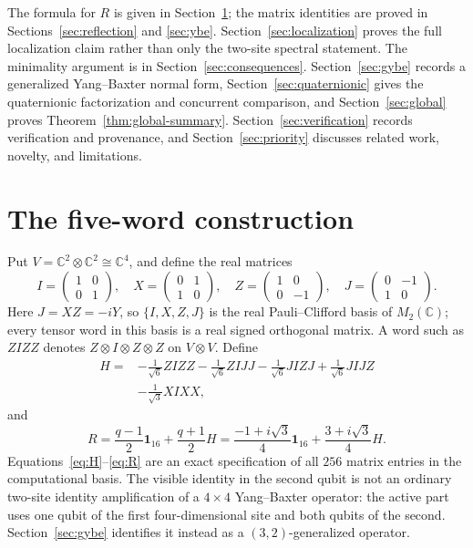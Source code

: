 \documentclass[11pt]{article}
\theoremstyle{remark}
\newcommand{\Id}{\mathbf 1}
\newcommand{\bbC}{\mathbb C}
\begin{document}
The formula for \(R\) is given in Section~\ref{sec:construction}; the matrix
identities are proved in Sections~\ref{sec:reflection} and
\ref{sec:ybe}.  Section~\ref{sec:localization} proves the full localization
claim rather than only the two-site spectral statement.  The minimality
argument is in Section~\ref{sec:consequences}.  Section~\ref{sec:gybe}
records a generalized Yang--Baxter normal form, Section~\ref{sec:quaternionic}
gives the quaternionic factorization and concurrent comparison, and
Section~\ref{sec:global} proves Theorem~\ref{thm:global-summary}.
Section~\ref{sec:verification} records verification and provenance, and
Section~\ref{sec:priority} discusses related work, novelty, and limitations.

\section{The five-word construction}\label{sec:construction}

Put \(V=\bbC^2\otimes\bbC^2\cong\bbC^4\), and define the real matrices
\[
  I=\begin{pmatrix}1&0\\0&1\end{pmatrix},\quad
  X=\begin{pmatrix}0&1\\1&0\end{pmatrix},\quad
  Z=\begin{pmatrix}1&0\\0&-1\end{pmatrix},\quad
  J=\begin{pmatrix}0&-1\\1&0\end{pmatrix}.
\]
Here \(J=XZ=-iY\), so \(\{I,X,Z,J\}\) is the real Pauli--Clifford basis of
\(M_2(\bbC)\); every tensor word in this basis is a real signed orthogonal
matrix.
A word such as \(ZIZZ\) denotes
\(Z\otimes I\otimes Z\otimes Z\) on \(V\otimes V\).  Define
\begin{equation}
\begin{split}
  H={}&-\frac1{\sqrt6}ZIZZ-\frac1{\sqrt6}ZIJJ
        -\frac1{\sqrt6}JIZJ+\frac1{\sqrt6}JIJZ\\
      &-\frac1{\sqrt3}XIXX,
  \label{eq:H}
\end{split}
\end{equation}
and
\begin{equation}
  R=\frac{q-1}{2}\Id_{16}+\frac{q+1}{2}H
   =\frac{-1+i\sqrt3}{4}\Id_{16}
    +\frac{3+i\sqrt3}{4}H.
  \label{eq:R}
\end{equation}
Equations~\eqref{eq:H}--\eqref{eq:R} are an exact specification of all
\(256\) matrix entries in the computational basis.
The visible identity in the second qubit is not an ordinary two-site identity
amplification of a \(4\times4\) Yang--Baxter operator: the active part uses one
qubit of the first four-dimensional site and both qubits of the second.
Section~\ref{sec:gybe} identifies it instead as a \((3,2)\)-generalized
operator.
\end{document}
